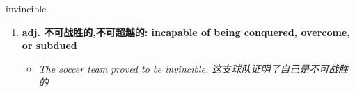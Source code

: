 
\begin{frame}
{\huge invincible}
\begin{center}
\begin{enumerate}\Large
  \item \textbf{adj. 不可战胜的,不可超越的: incapable of being conquered, overcome, or subdued}
  \begin{itemize}
    \item \em{\Large{The soccer team proved to be invincible. 这支球队证明了自己是不可战胜的}}
  \end{itemize}
\end{enumerate}
\end{center}
\end{frame}
